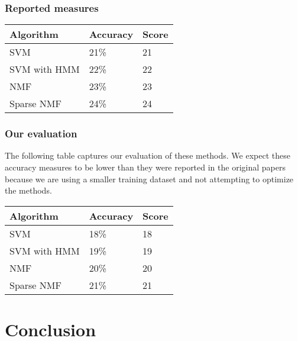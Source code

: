 \documentclass[5p]{elsarticle}
\begin{document}
\subsubsection{Reported measures}
\begin{center}
\begin{tabular}{|l|l|l|}
\hline
Algorithm & Accuracy & Score \\ \hline
SVM & 21\% & 21 \\ \hline
SVM with HMM & 22\% & 22 \\ \hline
NMF & 23\% & 23 \\ \hline
Sparse NMF & 24\% & 24 \\ \hline
\end{tabular}
\end{center}

\subsubsection{Our evaluation}

The following table captures our evaluation of these methods. We expect these accuracy measures to be lower than they were reported in the original papers because we are using a smaller training dataset and not attempting to optimize the methods. 

\begin{center}
\begin{tabular}{|l|l|l|}
\hline
Algorithm & Accuracy & Score \\ \hline
SVM & 18\% & 18 \\ \hline
SVM with HMM & 19\% & 19 \\ \hline
NMF & 20\% & 20 \\ \hline
Sparse NMF & 21\% & 21 \\ \hline
\end{tabular}
\end{center}

\section{Conclusion}



\end{document}

